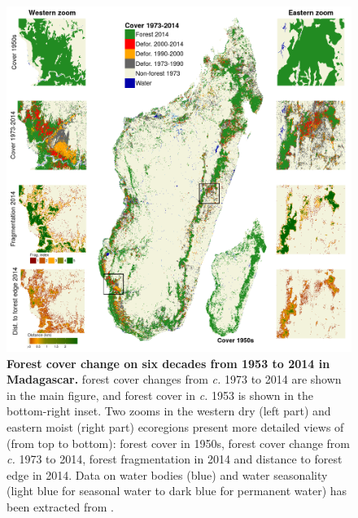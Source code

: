 \documentclass[a4paper, 12pt, leqno]{article}\usepackage[]{graphicx}\usepackage[]{color}
\begin{document}
\newpage

\begin{figure}[h!]
  \centering
  
  \includegraphics[width=\textwidth]{figs/fig_fcc.png}

  \caption{\textbf{Forest cover change on six decades from 1953 to
      2014 in Madagascar.} forest cover changes from \emph{c.} 1973 to
    2014 are shown in the main figure, and forest cover in \emph{c.}
    1953 is shown in the bottom-right inset. Two zooms in the western
    dry (left part) and eastern moist (right part) ecoregions present
    more detailed views of (from top to bottom): forest cover in
    1950s, forest cover change from \emph{c.} 1973 to 2014, forest
    fragmentation in 2014 and distance to forest edge in 2014. Data on
    water bodies (blue) and water seasonality (light blue for seasonal
    water to dark blue for permanent water) has been extracted from
    \citet{Pekel2016}.}

  \label{fig:fcc}

\end{figure}

\newpage
\end{document}
